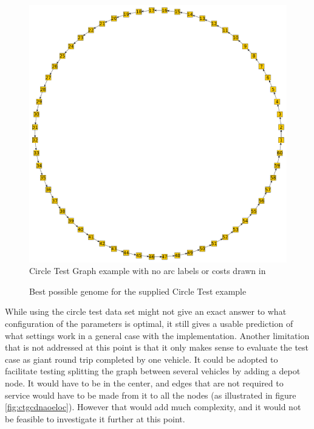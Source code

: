 \begin{figure}[H]
    \centerline{\includegraphics[width=\textwidth]{figures/CircleTests/CircleTestIllustrations/Circle_Test_Graph-No_arc_labels_or_costs.pdf}}
    \caption{Circle Test Graph example with no arc labels or costs drawn in}
    \label{fig:ctgnaloc}
\end{figure}

\begin{figure}[H]
    \noindent
    \caption{Best possible genome for the supplied Circle Test example}
    \label{fig:bpgftscte}
\end{figure}

While using the circle test data set might not give an exact answer to what configuration of the parameters is optimal, it still gives a usable prediction of what settings work in a general case with the implementation. Another limitation that is not addressed at this point is that it only makes sense to evaluate the test case as giant round trip completed by one vehicle. It could be adopted to facilitate testing splitting the graph between several vehicles by adding a depot node. It would have to be in the center, and edges that are not required to service would have to be made from it to all the nodes (as illustrated in figure \ref{fig:ctgcdnaoeloc}). However that would add much complexity, and it would not be feasible to investigate it further at this point.

